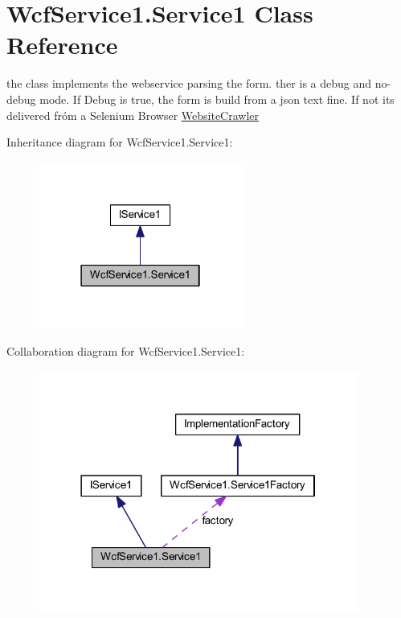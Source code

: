 \hypertarget{class_wcf_service1_1_1_service1}{}\section{Wcf\+Service1.\+Service1 Class Reference}
\label{class_wcf_service1_1_1_service1}


the class implements the webservice parsing the form. ther is a debug and no-\/debug mode. If Debug is true, the form is build from a json text fine. If not it\textquotesingle{}s delivered fróm a Selenium Browser \hyperlink{class_wcf_service1_1_1_website_crawler}{Website\+Crawler}  




Inheritance diagram for Wcf\+Service1.\+Service1\+:\nopagebreak
\begin{figure}[H]
\begin{center}
\leavevmode
\includegraphics[width=190pt]{class_wcf_service1_1_1_service1__inherit__graph}
\end{center}
\end{figure}


Collaboration diagram for Wcf\+Service1.\+Service1\+:\nopagebreak
\begin{figure}[H]
\begin{center}
\leavevmode
\includegraphics[width=298pt]{class_wcf_service1_1_1_service1__coll__graph}
\end{center}
\end{figure}

